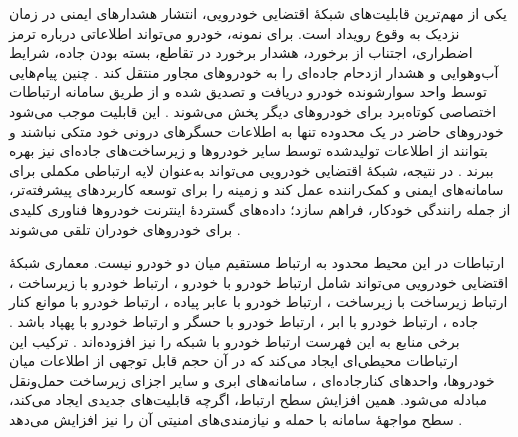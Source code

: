\documentclass[12pt,a4paper]{article}
\begin{document}
یکی از مهم‌ترین قابلیت‌های شبکهٔ اقتضایی خودرویی، انتشار هشدار‌های ایمنی در زمان نزدیک به وقوع رویداد است. برای نمونه، خودرو می‌تواند اطلاعاتی درباره ترمز اضطراری، اجتناب از برخورد، هشدار برخورد در تقاطع، بسته بودن جاده، شرایط آب‌وهوایی و هشدار ازدحام جاده‌ای را به خودرو‌های مجاور منتقل کند \cite{hozouriOverviewVANETVehicular2023}. چنین پیام‌هایی توسط واحد سوارشونده  خودرو دریافت و تصدیق شده و از طریق سامانه ارتباطات اختصاصی کوتاه‌برد  برای خودرو‌های دیگر پخش می‌شوند \cite{hozouriOverviewVANETVehicular2023}. این قابلیت موجب می‌شود خودرو‌های حاضر در یک محدوده تنها به اطلاعات حسگر‌های درونی خود متکی نباشند و بتوانند از اطلاعات تولیدشده توسط سایر خودرو‌ها و زیرساخت‌های جاده‌ای نیز بهره ببرند \cite{xuInternetVehiclesBig2018}. در نتیجه، شبکهٔ اقتضایی خودرویی می‌تواند به‌عنوان لایه ارتباطی مکملی برای سامانه‌های ایمنی و کمک‌راننده عمل کند و زمینه را برای توسعه کاربرد‌های پیشرفته‌تر، از جمله رانندگی خودکار، فراهم سازد؛ داده‌های گستردهٔ اینترنت خودرو‌ها  فناوری کلیدی برای خودرو‌های خودران تلقی می‌شوند \cite{xuInternetVehiclesBig2018}.

ارتباطات در این محیط محدود به ارتباط مستقیم میان دو خودرو نیست. معماری شبکهٔ اقتضایی خودرویی می‌تواند شامل ارتباط خودرو با خودرو ، ارتباط خودرو با زیرساخت ، ارتباط زیرساخت با زیرساخت ، ارتباط خودرو با عابر پیاده ، ارتباط خودرو با موانع کنار جاده ، ارتباط خودرو با ابر ، ارتباط خودرو با حسگر  و ارتباط خودرو با پهپاد  باشد \cite{hozouriOverviewVANETVehicular2023}. برخی منابع به این فهرست ارتباط خودرو با شبکه  را نیز افزوده‌اند \cite{farsimadanReviewSecurityChallenges2025}. ترکیب این ارتباطات محیطی‌ای ایجاد می‌کند که در آن حجم قابل توجهی از اطلاعات میان خودروها، واحد‌های کنارجاده‌ای ، سامانه‌های ابری و سایر اجزای زیرساخت حمل‌ونقل مبادله می‌شود. همین افزایش سطح ارتباط، اگرچه قابلیت‌های جدیدی ایجاد می‌کند، سطح مواجههٔ سامانه با حمله و نیازمندی‌های امنیتی آن را نیز افزایش می‌دهد \cite{hozouriOverviewVANETVehicular2023,farsimadanReviewSecurityChallenges2025}.
\end{document}
